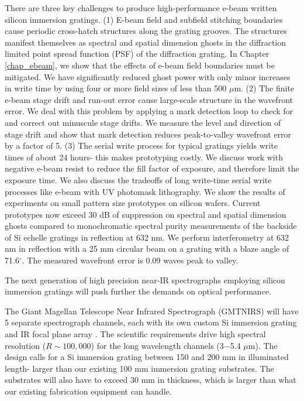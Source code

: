 There are three key challenges to produce high-performance e-beam written silicon immersion gratings.  (1) E-beam field and subfield stitching boundaries cause periodic cross-hatch structures along the grating grooves.   The structures manifest themselves as spectral and spatial dimension ghosts in the diffraction limited point spread function (PSF) of the diffraction grating.  In Chapter \ref{chap_ebeam}, we show that the effects of e-beam field boundaries must be mitigated.  We have significantly reduced ghost power with only minor increases in write time by using four or more field sizes of less than 500 $\mu$m. (2) The finite e-beam stage drift and run-out error cause large-scale structure in the wavefront error.  We deal with this problem by applying a mark detection loop to check for and correct out minuscule stage drifts.  We measure the level and direction of stage drift and show that mark detection reduces peak-to-valley wavefront error by a factor of 5. (3) The serial write process for typical gratings yields write times of about 24 hours- this makes prototyping costly.  We discuss work with negative e-beam resist to reduce the fill factor of exposure, and therefore limit the exposure time.
We also discuss the tradeoffs of long write-time serial write processes like e-beam with UV photomask lithography.  We show the results of experiments on small pattern size prototypes on silicon wafers.  Current prototypes now exceed 30 dB of suppression on spectral and spatial dimension ghosts compared to monochromatic spectral purity measurements of the backside of Si echelle gratings in reflection at 632 nm.  We perform interferometry at 632 nm in reflection with a 25 mm circular beam on a grating with a blaze angle of 71.6$^\circ$.  The measured wavefront error is 0.09 waves peak to valley.

The next generation of high precision near-IR spectrographs employing silicon immersion gratings will push further the demands on optical performance.  

The Giant Magellan Telescope Near Infrared Spectrograph (GMTNIRS) will have 5 separate spectrograph channels, each with its own custom Si immersion grating and IR focal plane array \citep{2014SPIE.9147E..22J}.  The scientific requirements drive high spectral resolution ($R\sim100,000$) for the long wavelength channels (3$-$5.4 $\mu$m).  The design calls for a Si immersion grating between 150 and 200 mm in illuminated length- larger than our existing 100 mm immersion grating substrates.  The substrates will also have to exceed 30 mm in thickness, which is larger than what our existing fabrication equipment can handle.  

